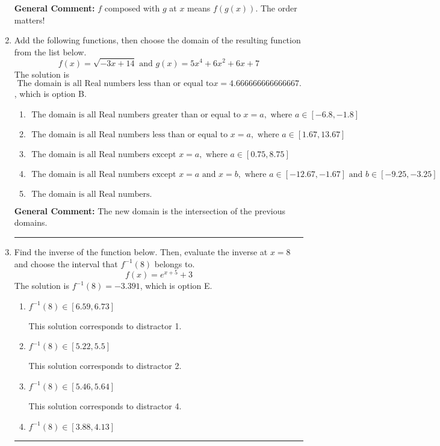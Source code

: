 \documentclass{extbook}[14pt]
\newcommand{\litem}[1]{\item #1

\rule{\textwidth}{0.4pt}}
\begin{document}
\begin{enumerate}
{\begin{enumerate}[label=\Alph*.]
\end{enumerate}

\textbf{General Comment:} $f$ composed with $g$ at $x$ means $f(g(x))$. The order matters!
}
\litem{
Add the following functions, then choose the domain of the resulting function from the list below.
\[ f(x) = \sqrt{-3x+14}  \text{ and } g(x) = 5x^{4} +6 x^{2} +6 x + 7 \]The solution is \( \text{ The domain is all Real numbers less than or equal to} x = 4.666666666666667. \), which is option B.\begin{enumerate}[label=\Alph*.]
\item \( \text{ The domain is all Real numbers greater than or equal to } x = a, \text{ where } a \in [-6.8, -1.8] \)


\item \( \text{ The domain is all Real numbers less than or equal to } x = a, \text{ where } a \in [1.67, 13.67] \)


\item \( \text{ The domain is all Real numbers except } x = a, \text{ where } a \in [0.75, 8.75] \)


\item \( \text{ The domain is all Real numbers except } x = a \text{ and } x = b, \text{ where } a \in [-12.67, -1.67] \text{ and } b \in [-9.25, -3.25] \)


\item \( \text{ The domain is all Real numbers. } \)


\end{enumerate}

\textbf{General Comment:} The new domain is the intersection of the previous domains.
}
\litem{
Find the inverse of the function below. Then, evaluate the inverse at $x = 8$ and choose the interval that $f^{-1}(8)$ belongs to.
\[ f(x) = e^{x+5}+3 \]The solution is \( f^{-1}(8) = -3.391 \), which is option E.\begin{enumerate}[label=\Alph*.]
\item \( f^{-1}(8) \in [6.59, 6.73] \)

 This solution corresponds to distractor 1.
\item \( f^{-1}(8) \in [5.22, 5.5] \)

 This solution corresponds to distractor 2.
\item \( f^{-1}(8) \in [5.46, 5.64] \)

 This solution corresponds to distractor 4.
\item \( f^{-1}(8) \in [3.88, 4.13] \)


\end{enumerate}}
\end{enumerate}
\end{document}

